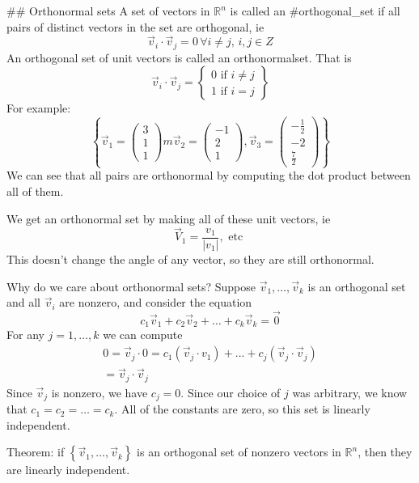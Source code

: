 ## Orthonormal sets
A set of vectors in $\mathbb{R}^{n}$ is called an #orthogonal_set if all pairs of distinct vectors in the set are orthogonal, ie 
$$
\vec{v}_{i}\cdot \vec{v}_{j}=0 \, \forall i\neq j, \, i,j\in Z
$$
An orthogonal set of unit vectors is called an orthonormalset. That is
$$
\vec{v}_{i}\cdot \vec{v}_{j}=\begin{Bmatrix}
0 \text{ if } i\neq j \\
1 \text{ if } i = j
\end{Bmatrix}
$$
For example:
$$
\left\{ \vec{v}_{1}=\begin{pmatrix}
3 \\ 1 \\ 1 
\end{pmatrix}m \vec{v}_{2} = \begin{pmatrix}
-1 \\ 2 \\ 1
\end{pmatrix}, \vec{v}_{3} = \begin{pmatrix}
-\frac{1}{2} \\ -2 \\ \frac{7}{2}
\end{pmatrix} \right\}
$$
We can see that all pairs are orthonormal by computing the dot product between all of them.

We get an orthonormal set by making all of these unit vectors, ie 
$$
\vec{V}_{1} = \frac{v_{1}}{\left| v_{1} \right|},\text{ etc }
$$
This doesn't change the angle of any vector, so they are still orthonormal. 

Why do we care about orthonormal sets?
Suppose $\vec{v}_{1},\dots,\vec{v}_{k}$ is an orthogonal set and all $\vec{v}_{i}$ are nonzero, and consider the equation
$$
c_{1}\vec{v}_{1}+c_{2}\vec{v}_{2}+\dots+c_{k}\vec{v}_{k} = \vec{0}
$$
For any $j=1,\dots, k$ we can compute 
$$
\begin{align}
0 = \vec{v}_{j}\cdot 0 = c_{1}(\vec{v}_{j}\cdot v_{1}) + \dots + c_{j}(\vec{v}_{j}\cdot \vec{v}_{j})  \\
= \vec{v}_{j}\cdot \vec{v}_{j}
\end{align}
$$
Since $\vec{v}_{j}$ is nonzero, we have $c_{j} = 0$. Since our choice of $j$ was arbitrary, we know that $c_{1}=c_{2}=\dots=c_{k}$. All of the constants are zero, so this set is linearly independent. 

Theorem: if $\left\{ \vec{v}_{1},\dots,\vec{v}_{k} \right\}$ is an orthogonal set of nonzero vectors in $\mathbb{R}^{n}$, then they are linearly independent. 

